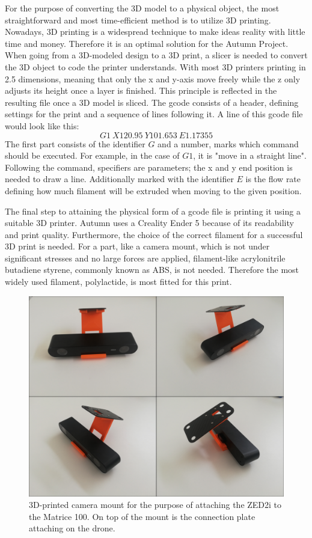 For the purpose of converting the 3D model to a physical object, the most straightforward and most time-efficient method is to utilize 3D printing. Nowadays, 3D printing is a widespread technique to make ideas reality with little time and money. Therefore it is an optimal solution for the Autumn Project. 
When going from a 3D-modeled design to a 3D print, a slicer is needed to convert the 3D object to code the printer understands. With most 3D printers printing in 2.5 dimensions, meaning that only the x and y-axis move freely while the z only adjusts its height once a layer is finished. This principle is reflected in the resulting file once a 3D model is sliced. The gcode consists of a header, defining settings for the print and a sequence of lines following it. A line of this gcode file would look like this: 
\[G1\ X120.95\ Y101.653\ E1.17355\]
The first part consists of the identifier $G$ and a number, marks which command should be executed. For example, in the case of $G1$, it is "move in a straight line". Following the command, specifiers are parameters; the x and y end position is needed to draw a line. Additionally marked with the identifier $E$ is the flow rate defining how much filament will be extruded when moving to the given position.

The final step to attaining the physical form of a gcode file is printing it using a suitable 3D printer. Autumn uses a Creality Ender 5 because of its readability and print quality. Furthermore, the choice of the correct filament for a successful 3D print is needed. For a part, like a camera mount, which is not under significant stresses and no large forces are applied, filament-like acrylonitrile butadiene styrene, commonly known as ABS, is not needed. Therefore the most widely used filament, polylactide, is most fitted for this print.

\begin{figure}[h]
	\centering
	\includegraphics[width=0.6\linewidth]{img/MountPrint}
	\caption{3D-printed camera mount for the purpose of attaching the ZED2i to the Matrice 100. On top of the mount is the connection plate attaching on the drone.}
	\label{fig:custom_parts_mountPrint}
\end{figure}

